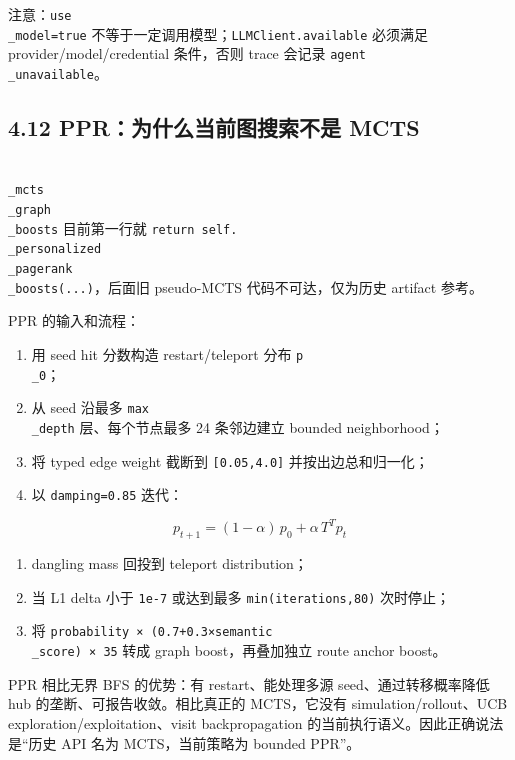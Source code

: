 \documentclass[UTF8,12pt,openany]{ctexbook}
\begin{document}
注意：\texttt{use\\_model=true} 不等于一定调用模型；\texttt{LLMClient.available} 必须满足 provider/model/credential 条件，否则 trace 会记录 \texttt{agent\\_unavailable}。\par

\subsection{4.12 PPR：为什么当前图搜索不是 MCTS}

\texttt{\\_mcts\\_graph\\_boosts} 目前第一行就 \texttt{return self.\\_personalized\\_pagerank\\_boosts(...)}，后面旧 pseudo-MCTS 代码不可达，仅为历史 artifact 参考。\par

PPR 的输入和流程：\par

\begin{enumerate}
\item 用 seed hit 分数构造 restart/teleport 分布 \texttt{p\\_0}；
\item 从 seed 沿最多 \texttt{max\\_depth} 层、每个节点最多 24 条邻边建立 bounded neighborhood；
\item 将 typed edge weight 截断到 \texttt{[0.05,4.0]} 并按出边总和归一化；
\item 以 \texttt{damping=0.85} 迭代：
\end{enumerate}

\[
p_{t+1}=(1-\alpha)\,p_0+\alpha\,T^Tp_t
\]

\begin{enumerate}
\item dangling mass 回投到 teleport distribution；
\item 当 L1 delta 小于 \texttt{1e-7} 或达到最多 \texttt{min(iterations,80)} 次时停止；
\item 将 \texttt{probability × (0.7+0.3×semantic\\_score) × 35} 转成 graph boost，再叠加独立 route anchor boost。
\end{enumerate}

PPR 相比无界 BFS 的优势：有 restart、能处理多源 seed、通过转移概率降低 hub 的垄断、可报告收敛。相比真正的 MCTS，它没有 simulation/rollout、UCB exploration/exploitation、visit backpropagation 的当前执行语义。因此正确说法是“历史 API 名为 MCTS，当前策略为 bounded PPR”。\par
\end{document}
